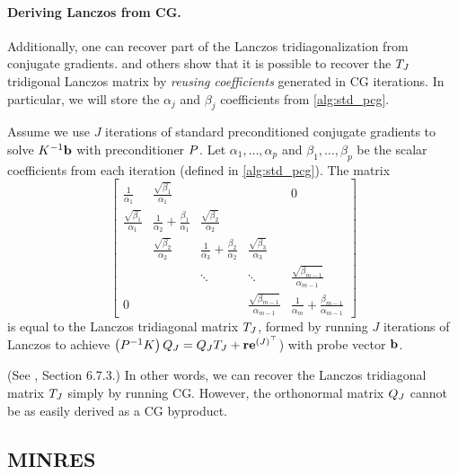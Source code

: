\paragraph{Deriving Lanczos from CG.}
Additionally, one can recover part of the Lanczos tridiagonalization from conjugate gradients.
\citet{saad2003iterative} and others show that it is possible to recover the $T_J$ tridigonal Lanczos matrix by \emph{reusing coefficients} generated in CG iterations.
In particular, we will store the $\alpha_j$ and $\beta_j$ coefficients from \cref{alg:std_pcg}.
%
\begin{observation}
  Assume we use $J$ iterations of standard preconditioned conjugate gradients to solve $K^{-1} \mathbf{b}$ with preconditioner $P$.
  Let $\alpha_1, \ldots, \alpha_p$ and $\beta_1, \ldots, \beta_p$ be the scalar coefficients from each iteration (defined in \cref{alg:std_pcg}).
  The matrix
  \begin{equation*}
    \left[\begin{array}{ccccc}
      \frac{1}{\alpha_1} & \frac{\sqrt{\beta_1}}{\alpha_1} &  & & 0 \\
      \frac{\sqrt{\beta_1}}{\alpha_1} & \frac{1}{\alpha_2} + \frac{\beta_1}{\alpha_1} & \frac{\sqrt{\beta_2}}{\alpha_2} &  &  \\
      & \frac{\sqrt{\beta_2}}{\alpha_2} & \frac{1}{\alpha_3} + \frac{\beta_2}{\alpha_2} & \frac{\sqrt{\beta_3}}{\alpha_3} &  \\
      &       & \ddots & \ddots & \frac{\sqrt{\beta_{m-1}}}{\alpha_{m-1}} \\
      0 &       &        & \frac{\sqrt{\beta_{m-1}}}{\alpha_{m-1}} & \frac{1}{\alpha_m} + \frac{\beta_{m-1}}{\alpha_{m-1}}
    \end{array}\right]
  \end{equation*}
  is equal to the Lanczos tridiagonal matrix $T_J$, formed by running $J$ iterations of Lanczos to achieve $\left( P^{-1} K \right) Q_J = Q_J T_J + \mathbf{r} \mathbf{e}^{(J)^\top}$) with probe vector $\mathbf{b}$.
  \label{obs:lanczos_cg}
\end{observation}
(See \cite{saad2003iterative}, Section 6.7.3.)
In other words, we can recover the Lanczos tridiagonal matrix $T_J$ simply by running CG.
However, the orthonormal matrix $Q_J$ cannot be as easily derived as a CG byproduct.


\subsection{MINRES}
\label{sec:minres}

